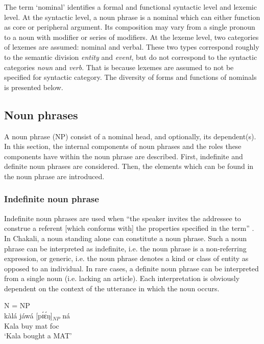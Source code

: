\begin{exe}
\begin{exe}
\begin{exe}
{The term `nominal'  identifies  a formal and functional  syntactic level and
lexemic level. At the syntactic level, a noun phrase is a nominal  which can
either function as core or peripheral argument.  Its composition may
vary from a single pronoun to a noun with modifier or series of
modifiers. At the lexeme level, two categories of lexemes are assumed:
nominal and verbal. These two types correspond roughly to the semantic division
{\it entity} and {\it event}, but do not correspond to the syntactic categories
{\it noun} and {\it verb}. That is because lexemes are assumed to not be
specified for syntactic category. The diversity  of forms and functions of
nominals is presented below. 


\subsection{Noun phrases}
\label{sec:GRM-verb-phrases}

A noun phrase (NP)  consist of a nominal head, and optionally, its dependent(s).
In this section,  the internal components of noun phrases and the roles these
components have within the noun phrase are described. First,   indefinite and
definite noun phrases are considered. Then, the elements which can be found in
the noun phrase are introduced. 

\subsubsection{Indefinite noun phrase}
\label{sec:GRM-np-indef}

Indefinite noun phrases are used when ``the speaker invites the addressee to
construe a referent [which conforms with] the properties specified in the term''
\citep[184]{Dik97}.  In Chakali, a noun standing alone can  constitute a noun
phrase. Such a 
noun phrase can be interpreted as indefinite, i.e. the noun phrase is a
non-referring expression,  or   generic, i.e. the noun phrase 
denotes  a kind or class of entity  as opposed to an individual.  In rare cases,
a
definite noun phrase can be interpreted from a single noun  (i.e. lacking  an
  article). Each interpretation is obviously dependent on the context of
the utterance in which the noun occurs.

\ea\label{GRM-np-type-indef}{\rm  N = NP}\\

 
\ea\label{GRM-np-indef-1}
\gll  kàlá jáwá   [pɪ́ɛ́ŋ]$_{NP}$ ná\\
     Kala buy mat {\sc foc}\\
\glt  `Kala bought a MAT' 


}
\end{exe}
\end{exe}
\end{exe}
